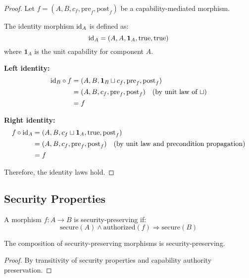 \begin{proof}
Let $f = (A, B, c_f, \text{pre}_f, \text{post}_f)$ be a capability-mediated morphism.

The identity morphism $\mathrm{id}_A$ is defined as:
\begin{equation}
\mathrm{id}_A = (A, A, \mathbf{1}_A, \text{true}, \text{true})
\end{equation}
where $\mathbf{1}_A$ is the unit capability for component $A$.

\textbf{Left identity:}
\begin{align}
\mathrm{id}_B \circ f &= (A, B, \mathbf{1}_B \sqcup c_f, \text{pre}_f, \text{post}_f) \\
&= (A, B, c_f, \text{pre}_f, \text{post}_f) \quad \text{(by unit law of $\sqcup$)} \\
&= f
\end{align}

\textbf{Right identity:}
\begin{align}
f \circ \mathrm{id}_A &= (A, B, c_f \sqcup \mathbf{1}_A, \text{true}, \text{post}_f) \\
&= (A, B, c_f, \text{pre}_f, \text{post}_f) \quad \text{(by unit law and precondition propagation)} \\
&= f
\end{align}

Therefore, the identity laws hold.
\end{proof}

\subsection{Security Properties}

\begin{definition}
A morphism $f: A \to B$ is security-preserving if:
\begin{equation}
\text{secure}(A) \land \text{authorized}(f) \Rightarrow \text{secure}(B)
\end{equation}
\end{definition}

\begin{theorem}
The composition of security-preserving morphisms is security-preserving.
\end{theorem}

\begin{proof}
By transitivity of security properties and capability authority preservation.
\end{proof}

